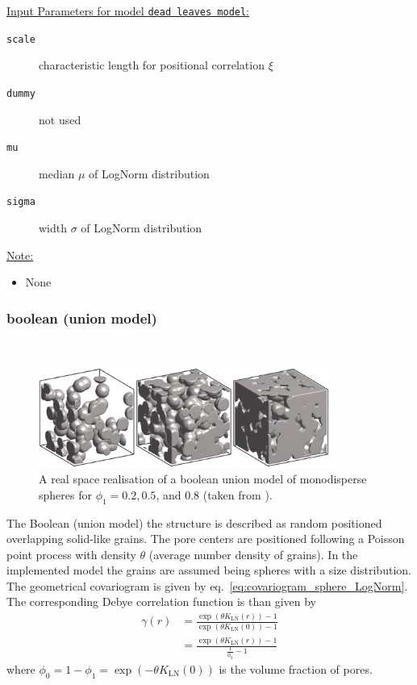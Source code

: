 \underline{Input Parameters for model \texttt{dead leaves model}:}\\
\begin{description}
\item[\texttt{scale}] characteristic length for positional correlation $\xi$
\item[\texttt{dummy}] not used
\item[\texttt{mu}] median $\mu$ of LogNorm distribution
\item[\texttt{sigma}] width $\sigma$ of LogNorm distribution
\end{description}

\vspace{5mm}

\underline{Note:}
\begin{itemize}
\item None
\end{itemize}


\newpage
\subsubsection{boolean (union model)}~\\

\begin{figure}[htb]
\begin{center}
\includegraphics[width=0.85\textwidth]{../images/form_factor/nonparticular/boolean_union_3D.png}
\end{center}
\caption{A real space realisation of a boolean union model of monodisperse spheres for $\phi_1=0.2, 0.5$, and 0.8 (taken from \cite{Gommes2018}).} \label{fig:BooleanUnion3D}
\end{figure}

The Boolean (union model) the structure is described as random positioned overlapping solid-like grains. The pore centers are positioned following a Poisson point process with density $\theta$ (average number density of grains). In the implemented model the grains are assumed being spheres with a size distribution. The geometrical covariogram is given by eq.\ \ref{eq:covariogram_sphere_LogNorm}. The corresponding Debye correlation function is than given by
\begin{align}\label{eq:Debye_correlation_function_boolean_union}
  \gamma(r) &= \frac{\exp\left(\theta K_\mathrm{LN}(r)\right)-1}{\exp\left(\theta K_\mathrm{LN}(0)\right)-1} \\
            &= \frac{\exp\left(\theta K_\mathrm{LN}(r)\right)-1}{\frac{1}{\phi_0}-1}
\end{align}
where $\phi_0=1-\phi_1=\exp(-\theta K_\mathrm{LN}(0))$ is the volume fraction of pores.

